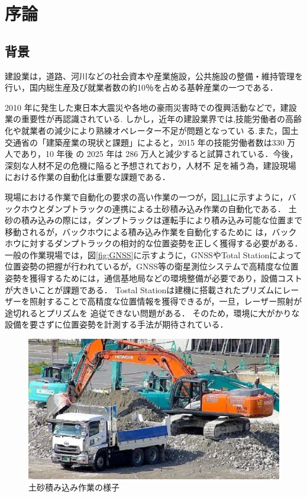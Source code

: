 \chapter{序論}
\thispagestyle{empty}
\label{Chap1}
\minitoc

\newpage

\section{背景}
\label{Background}
建設業は，道路、河川などの社会資本や産業施設，公共施設の整備・維持管理を行い，国内総生産及び就業者数の約10％を占める基幹産業の一つである．
\par 2010 年に発生した東日本大震災や各地の豪雨災害時での復興活動などで，建設業の重要性が再認識されている.
しかし，近年の建設業界では,技能労働者の高齢化や就業者の減少により熟練オペレーター不足が問題となってい
る.また，国土交通省の「建築産業の現状と課題」\cite{建設経済研究所2017}によると，2015 年の技能労働者数は330 万人であり，10 年後
の 2025 年は 286 万人と減少すると試算されている．今後，深刻な人材不足の危機に陥ると予想されており，人材不
足を補う為，建設現場における作業の自動化は重要な課題である．
\par
現場における作業で自動化の要求の高い作業の一つが，図\ref{fig:dosha}に示すように，バックホウとダンプトラックの連携による土砂積み込み作業の自動化である．
土砂の積み込みの際には，ダンプトラックは運転手により積み込み可能な位置まで移動されるが，バックホウによる積み込み作業を自動化するために
は，バックホウに対するダンプトラックの相対的な位置姿勢を正しく獲得する必要がある．
一般の作業現場では，図\ref{fig:GNSS}に示すように，GNSSやTotal Stationによって位置姿勢の把握\cite{土井下2010}が行われているが，GNSS等の衛星測位システムで高精度な位置姿勢を獲得するためには，通信基地局などの環境整備が必要であり，設備コストが大きいことが課題である．
Tostal Stationは建機に搭載されたプリズムにレーザーを照射することで高精度な位置情報を獲得できるが，一旦，レーザー照射が途切れるとプリズムを
追従できない問題がある．
そのため，環境に大がかりな設備を要さずに位置姿勢を計測する手法が期待されている．
\begin{figure}[b]
    \begin{center}
    \includegraphics[width=0.5\columnwidth]{./chap1/fig/dosha.eps}
    \caption{土砂積み込み作業の様子}
    \label{fig:dosha}
    \end{center}
\end{figure}
 
